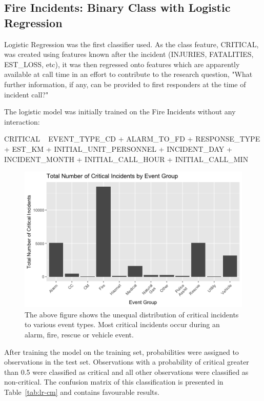 \documentclass[12pt,letterpaper, oneside]
{article}
\begin{document}
\subsection{Fire Incidents: Binary Class with Logistic Regression}

Logistic Regression was the first classifier used. As the class feature, \textsf{CRITICAL}, was created using features known after the incident (\textsf{INJURIES, FATALITIES, EST\_LOSS}, etc), it was then regressed onto features which are apparently available at call time in an effort to contribute to the research question, "What further information, if any, can be provided to first responders at the time of incident call?"

The logistic model was initially trained on the Fire Incidents without any interaction: 

\noindent\textsf{CRITICAL ~ EVENT\_TYPE\_CD + ALARM\_TO\_FD + RESPONSE\_TYPE + EST\_KM + INITIAL\_UNIT\_PERSONNEL + INCIDENT\_DAY + INCIDENT\_MONTH + INITIAL\_CALL\_HOUR + INITIAL\_CALL\_MIN}

\begin{figure}
	\centering
		\includegraphics[width=\textwidth]{total_critical_incidents_by_event_group}
		\caption{The above figure shows the unequal distribution of critical incidents to various event types. Most critical incidents occur during an alarm, fire, rescue or vehicle event.
			\label{fig:critical-events}
		}
\end{figure}

After training the model on the training set, probabilities were assigned to observations in the test set. Observations with a probability of critical greater than 0.5 were classified as critical and all other observations were classified as non-critical. The confusion matrix of this classification is presented in Table~\ref{tab:lr-cm} and contains favourable results.
\end{document}
